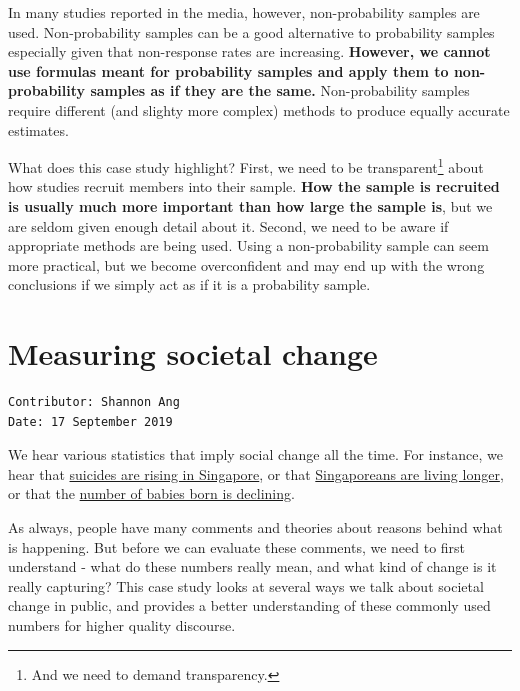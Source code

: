 \documentclass[
  openany]{book}
\begin{document}
In many studies reported in the media, however, non-probability samples are used. Non-probability samples can be a good alternative to probability samples especially given that non-response rates are increasing. \textbf{However, we cannot use formulas meant for probability samples and apply them to non-probability samples as if they are the same.} Non-probability samples require different (and slighty more complex) methods to produce equally accurate estimates.

What does this case study highlight? First, we need to be transparent\footnote{And we need to demand transparency.} about how studies recruit members into their sample. \textbf{How the sample is recruited is usually much more important than how large the sample is}, but we are seldom given enough detail about it. Second, we need to be aware if appropriate methods are being used. Using a non-probability sample can seem more practical, but we become overconfident and may end up with the wrong conclusions if we simply act as if it is a probability sample.

\hypertarget{apc}{%
\chapter{Measuring societal change}\label{apc}}

\begin{verbatim}
Contributor: Shannon Ang
Date: 17 September 2019
\end{verbatim}

We hear various statistics that imply social change all the time. For instance, we hear that \href{https://www.channelnewsasia.com/news/singapore/suicides-number-2018-teenagers-boys-highest-11761480}{suicides are rising in Singapore}, or that \href{https://www.todayonline.com/singapore/singaporeans-living-longer-spending-greater-proportion-time-ill-health-study}{Singaporeans are living longer}, or that the \href{https://www.channelnewsasia.com/news/singapore/number-of-babies-born-in-singapore-falls-to-lowest-in-8-years-11743722}{number of babies born is declining}.

As always, people have many comments and theories about reasons behind what is happening. But before we can evaluate these comments, we need to first understand - what do these numbers really mean, and what kind of change is it really capturing? This case study looks at several ways we talk about societal change in public, and provides a better understanding of these commonly used numbers for higher quality discourse.
\end{document}
